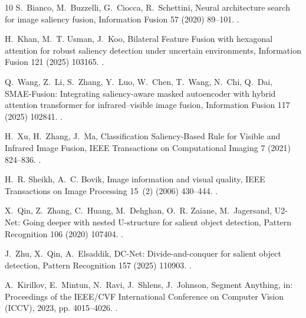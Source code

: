 \begin{thebibliography}{10}
S.~Bianco, M.~Buzzelli, G.~Ciocca, R.~Schettini, {Neural architecture search
  for image saliency fusion}, Information Fusion 57 (2020) 89--101.
\newblock \href {https://doi.org/10.1016/j.inffus.2019.12.007}
  {}.

H.~Khan, M.~T. Usman, J.~Koo, {Bilateral Feature Fusion with hexagonal
  attention for robust saliency detection under uncertain environments},
  Information Fusion 121 (2025) 103165.
\newblock \href {https://doi.org/10.1016/j.inffus.2025.103165}
  {}.

Q.~Wang, Z.~Li, S.~Zhang, Y.~Luo, W.~Chen, T.~Wang, N.~Chi, Q.~Dai,
  {SMAE-Fusion: Integrating saliency-aware masked autoencoder with hybrid
  attention transformer for infrared–visible image fusion}, Information
  Fusion 117 (2025) 102841.
\newblock \href {https://doi.org/10.1016/j.inffus.2024.102841}
  {}.

H.~Xu, H.~Zhang, J.~Ma, {Classification Saliency-Based Rule for Visible and
  Infrared Image Fusion}, IEEE Transactions on Computational Imaging 7 (2021)
  824--836.
\newblock \href {https://doi.org/10.1109/tci.2021.3100986}
  {}.

H.~R. Sheikh, A.~C. Bovik, {Image information and visual quality}, IEEE
  Transactions on Image Processing 15~(2) (2006) 430--444.
\newblock \href {https://doi.org/10.1109/TIP.2005.859378}
  {}.

X.~Qin, Z.~Zhang, C.~Huang, M.~Dehghan, O.~R. Zaiane, M.~Jagersand, {U2-Net:
  Going deeper with nested U-structure for salient object detection}, Pattern
  Recognition 106 (2020) 107404.
\newblock \href {https://doi.org/10.1016/j.patcog.2020.107404}
  {}.

J.~Zhu, X.~Qin, A.~Elsaddik, {DC-Net: Divide-and-conquer for salient object
  detection}, Pattern Recognition 157 (2025) 110903.
\newblock \href {https://doi.org/10.1016/j.patcog.2024.110903}
  {}.

A.~Kirillov, E.~Mintun, N.~Ravi, J.~Shlens, J.~Johnson, {Segment Anything}, in:
  Proceedings of the IEEE/CVF International Conference on Computer Vision
  (ICCV), 2023, pp. 4015--4026.
\newblock \href {https://doi.org/10.1109/ICCV51070.2023.00371}
  {}.


\end{thebibliography}
